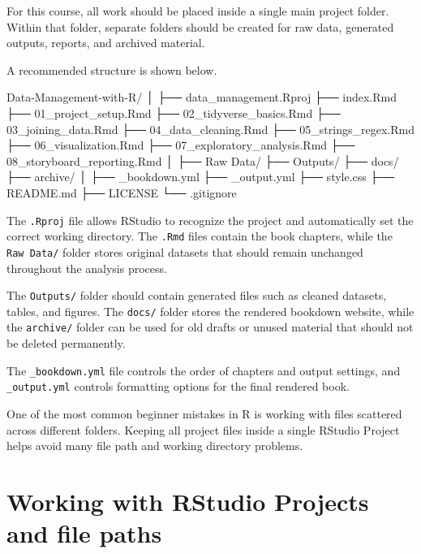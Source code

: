 \documentclass[
  11pt,
  oneside]{book}
\newenvironment{Shaded}{\begin{snugshade}}{\end{snugshade}}
\newcommand{\NormalTok}[1]{#1}
\begin{document}
For this course, all work should be placed inside a single main project folder. Within that folder, separate folders should be created for raw data, generated outputs, reports, and archived material.

A recommended structure is shown below.

\begin{Shaded}
\begin{Highlighting}[]
\NormalTok{Data{-}Management{-}with{-}R/}
\NormalTok{│}
\NormalTok{├── data\_management.Rproj}
\NormalTok{├── index.Rmd}
\NormalTok{├── 01\_project\_setup.Rmd}
\NormalTok{├── 02\_tidyverse\_basics.Rmd}
\NormalTok{├── 03\_joining\_data.Rmd}
\NormalTok{├── 04\_data\_cleaning.Rmd}
\NormalTok{├── 05\_strings\_regex.Rmd}
\NormalTok{├── 06\_visualization.Rmd}
\NormalTok{├── 07\_exploratory\_analysis.Rmd}
\NormalTok{├── 08\_storyboard\_reporting.Rmd}
\NormalTok{│}
\NormalTok{├── Raw Data/}
\NormalTok{├── Outputs/}
\NormalTok{├── docs/}
\NormalTok{├── archive/}
\NormalTok{│}
\NormalTok{├── \_bookdown.yml}
\NormalTok{├── \_output.yml}
\NormalTok{├── style.css}
\NormalTok{├── README.md}
\NormalTok{├── LICENSE}
\NormalTok{└── .gitignore}
\end{Highlighting}
\end{Shaded}

The \texttt{.Rproj} file allows RStudio to recognize the project and automatically set the correct working directory. The \texttt{.Rmd} files contain the book chapters, while the \texttt{Raw\ Data/} folder stores original datasets that should remain unchanged throughout the analysis process.

The \texttt{Outputs/} folder should contain generated files such as cleaned datasets, tables, and figures. The \texttt{docs/} folder stores the rendered bookdown website, while the \texttt{archive/} folder can be used for old drafts or unused material that should not be deleted permanently.

The \texttt{\_bookdown.yml} file controls the order of chapters and output settings, and \texttt{\_output.yml} controls formatting options for the final rendered book.

One of the most common beginner mistakes in R is working with files scattered across different folders. Keeping all project files inside a single RStudio Project helps avoid many file path and working directory problems.

\section{Working with RStudio Projects and file paths}\label{working-with-rstudio-projects-and-file-paths}
\end{document}
